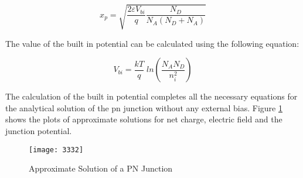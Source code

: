 \begin{doublespace}
\begin{equation}
x_{p}=\sqrt{\frac{2\varepsilon V_{bi}}{q}\frac{N_{D}}{N_{A}(N_{D}+N_{A})}}
\end{equation}

The value of the built in potential can be calculated using the following equation\cite{2000semiconductor}:

\begin{equation}
V_{bi}=\frac{kT}{q} \; ln(\frac{N_{A}N_{D}}{n_i^2})
\end{equation}

The calculation of the built in potential completes all the necessary equations for the analytical solution of the pn junction without any external bias. Figure \ref{pnplt} shows the plots of approximate solutions for net charge, electric field and the junction potential.

\begin{figure}
\centering
\texttt{[image: 3332]}
\caption{Approximate Solution of a PN Junction} 
\label{pnplt}
\end{figure}

\end{doublespace}

